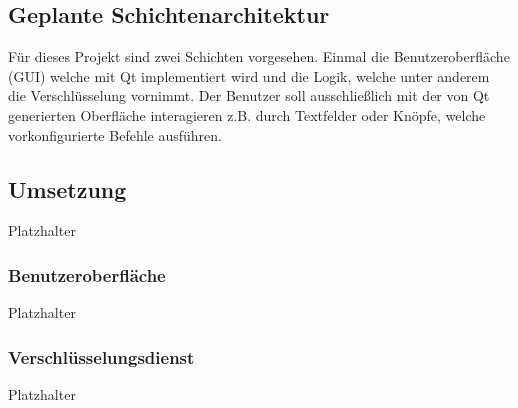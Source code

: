 \documentclass[12pt]{article}
\begin{document}
\subsection{Geplante Schichtenarchitektur}
Für dieses Projekt sind zwei Schichten vorgesehen. Einmal die Benutzeroberfläche (GUI) welche mit Qt implementiert wird und die Logik, welche unter anderem die Verschlüsselung vornimmt. Der Benutzer soll ausschließlich mit der von Qt generierten Oberfläche interagieren z.B. durch Textfelder oder Knöpfe, welche vorkonfigurierte Befehle ausführen.

\subsection{Umsetzung}
Platzhalter

\subsubsection{Benutzeroberfläche}
Platzhalter

\subsubsection{Verschlüsselungsdienst}
Platzhalter

\newpage
\end{document}
